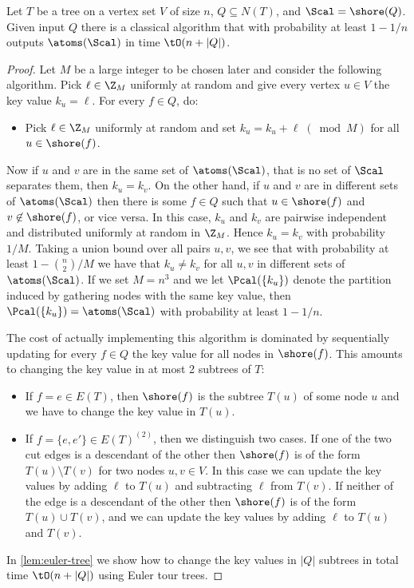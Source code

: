 \begin{lemma} \label{lem:2-resp-part}
Let $T$ be a tree on a vertex set $V$ of size $n$, $Q \subseteq N(T)$, and $\Scal = \shore(Q)$.  
Given input $Q$ there is a classical algorithm that with probability at least $1-1/n$ outputs $\atoms(\Scal)$ in time $\tO(n + |Q|)$.
\end{lemma}
\begin{proof}
Let $M$ be a large integer to be chosen later and consider the following algorithm.
Pick $\ell \in \Z_M$ uniformly at random and give every vertex $u \in V$ the key value $k_u = \ell$.
For every $f \in Q$, do:
\begin{itemize}
\item
Pick $\ell \in \Z_M$ uniformly at random and set $k_u = k_u + \ell \;(\bmod M)$ for all $u \in \shore(f)$.
\end{itemize}
Now if $u$ and $v$ are in the same set of $\atoms(\Scal)$, that is no set of $\Scal$ separates them, then $k_u = k_v$.
On the other hand, if $u$ and $v$ are in different sets of $\atoms(\Scal)$ then there is some $f \in Q$ such that $u \in \shore(f)$ and $v \not \in \shore(f)$, or vice versa. In this case,
$k_u$ and $k_v$ are pairwise independent 
and distributed uniformly at random in $\Z_M$.
Hence $k_u = k_v$ with probability $1/M$.
Taking a union bound over all pairs $u,v$, we see that with probability at least $1-\binom{n}{2}/M$ we have that $k_u \neq k_v$ for all $u,v$ in different sets of $\atoms(\Scal)$.
If we set $M = n^3$ and we let $\Pcal(\{k_u\})$ denote the partition induced by gathering nodes with the same key value, then $\Pcal(\{k_u\}) = \atoms(\Scal)$ with probability at least $1 - 1/n$.

The cost of actually implementing this algorithm is dominated by sequentially updating for every $f \in Q$ the key value for all nodes in $\shore(f)$.
This amounts to changing the key value in at most 2 subtrees of $T$:
\begin{itemize}
\item
If $f = e \in E(T)$, then $\shore(f)$ is the subtree $T(u)$ of some node $u$ and we have to change the key value in $T(u)$.
\item
If $f = \{e,e'\} \in E(T)^{(2)}$, then we distinguish two cases.
If one of the two cut edges is a descendant of the other then $\shore(f)$ is of the form $T(u) \setminus T(v)$ for two nodes $u,v \in V$.
In this case we can update the key values by adding $\ell$ to $T(u)$ and subtracting $\ell$ from $T(v)$.
If neither of the edge is a descendant of the other then $\shore(f)$ is of the form $T(u) \cup T(v)$, and we can update the key values by adding $\ell$ to $T(u)$ and $T(v)$.
\end{itemize}
In \cref{lem:euler-tree} we show how to change the key values in $|Q|$ subtrees in total time $\tO(n + |Q|)$ using Euler tour trees.
\end{proof}

